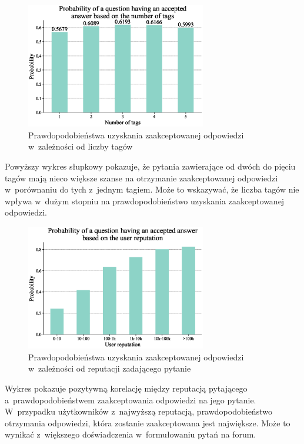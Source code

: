 \documentclass[12pt]{article}
\begin{document}
	\begin{figure}[H]
		\centering
		\includegraphics[width=0.7\textwidth]{tags_number}
		\caption{Prawdopodobieństwa uzyskania zaakceptowanej odpowiedzi w~zależności od liczby tagów}
		\label{fig:prawdopodobienstwa-uzyskania-odpowiedzi-liczba-tagow}
	\end{figure}
	Powyższy wykres słupkowy pokazuje, że pytania zawierające od dwóch do pięciu tagów mają nieco większe szanse na otrzymanie zaakceptowanej odpowiedzi w~porównaniu do tych z~jednym tagiem. Może to wskazywać, że liczba tagów nie wpływa w~dużym stopniu na prawdopodobieństwo uzyskania zaakceptowanej odpowiedzi.
	
	\begin{figure}[H]
		\centering
		\includegraphics[width=0.7\textwidth]{user_reputation}
		\caption{Prawdopodobieństwa uzyskania zaakceptowanej odpowiedzi w~zależności od reputacji zadającego pytanie}
		\label{fig:prawdopodobienstwa-uzyskania-odpowiedzi-reputacja}
	\end{figure}
	Wykres pokazuje pozytywną korelację między reputacją pytającego a~prawdopodobieństwem zaakceptowania odpowiedzi na jego pytanie. W~przypadku użytkowników z~najwyższą reputacją, prawdopodobieństwo otrzymania odpowiedzi, która zostanie zaakceptowana jest największe. Może to wynikać z~większego doświadczenia w~formułowaniu pytań na forum.
	
\end{document}
